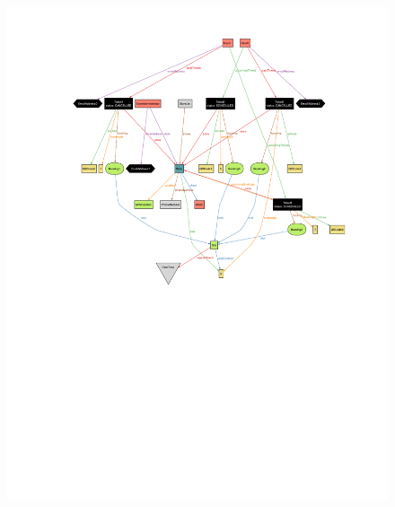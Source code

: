 \documentclass[table, 12pt]{article}
\begin{document}
\begin{landscape}
\begin{figure}[H]
        \includegraphics[scale=1.3]{assets/Alloy-Analyzer/world2.pdf}
    \end{figure}
    \thispagestyle{empty}
    \begin{figure}[H]
        \vspace*{-100px}
        \hspace*{-150px}

\end{figure}
\end{landscape}
\end{document}
